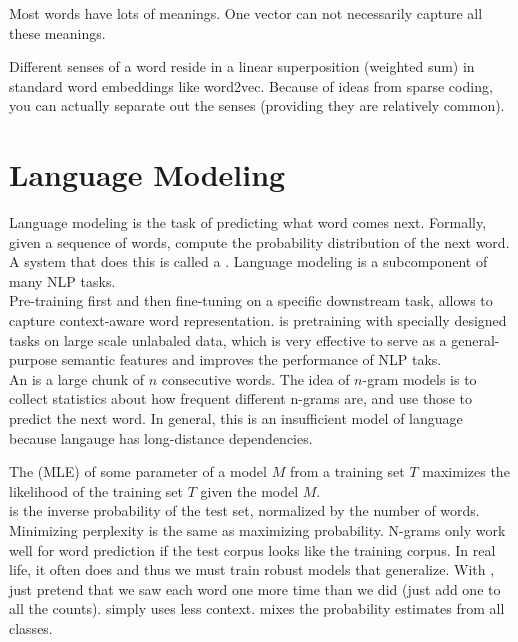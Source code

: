 \documentclass{article}
\begin{document}
\begin{remark}
  Most words have lots of meanings. One vector can not necessarily capture all these meanings. 
\end{remark}

Different senses of a word reside in a linear superposition (weighted sum) in standard word embeddings like word2vec. Because of ideas from sparse coding, you can actually separate out the senses (providing they are relatively common). 

\section{Language Modeling} 

Language modeling is the task of predicting what word comes next. Formally, given a sequence of words, compute the probability distribution of the next word. A system that does this is called a . Language modeling is a subcomponent of many NLP tasks. \\ 

Pre-training first and then fine-tuning on a specific downstream task, allows to capture context-aware word representation.  is pretraining with specially designed tasks on large scale unlabaled data, which is very effective to serve as a general-purpose semantic features and improves the performance of NLP taks. \\ 

An  is a large chunk of $n$ consecutive words. The idea of $n$-gram models is to collect statistics about how frequent different n-grams are, and use those to predict the next word. In general, this is an insufficient model of language because langauge has long-distance dependencies. 

The  (MLE) of some parameter of a model $M$ from a training set $T$ maximizes the likelihood of the training set $T$ given the model $M$. \\ 

 is the inverse probability of the test set, normalized by the number of words. Minimizing perplexity is the same as maximizing probability. N-grams only work well for word prediction if the test corpus looks like the training corpus. In real life, it often does and thus we must train robust models that generalize. With , just pretend that we saw each word one more time than we did (just add one to all the counts).  simply uses less context.  mixes the probability estimates from all classes. \\ 
\end{document}
